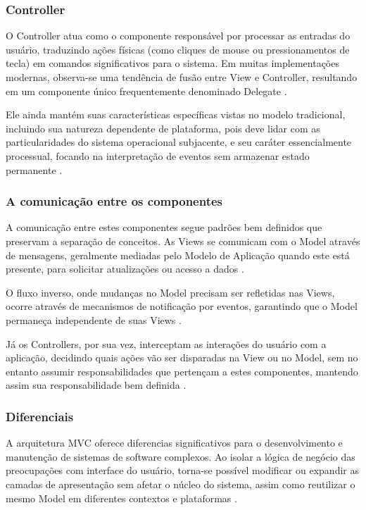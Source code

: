         \subsubsection{Controller}
            \par O Controller atua como o componente responsável por processar as entradas do usuário, traduzindo ações físicas (como cliques de mouse ou pressionamentos de tecla) em comandos significativos para o sistema. Em muitas implementações modernas, observa-se uma tendência de fusão entre View e Controller, resultando em um componente único frequentemente denominado Delegate \cite{artigo:deacon:2009}.
            
            \par Ele ainda mantém suas características específicas vistas no modelo tradicional, incluindo sua natureza dependente de plataforma, pois deve lidar com as particularidades do sistema operacional subjacente, e seu caráter essencialmente processual, focando na interpretação de eventos sem armazenar estado permanente \cite{artigo:deacon:2009}.
            
        \subsubsection{A comunicação entre os componentes}
        
            \par A comunicação entre estes componentes segue padrões bem definidos que preservam a separação de conceitos. As Views se comunicam com o Model através de mensagens, geralmente mediadas pelo Modelo de Aplicação quando este está presente, para solicitar atualizações ou acesso a dados \cite{artigo:deacon:2009}.
            
            \par O fluxo inverso, onde mudanças no Model precisam ser refletidas nas Views, ocorre através de mecanismos de notificação por eventos, garantindo que o Model permaneça independente de suas Views \cite{artigo:deacon:2009}.
            
            \par Já os Controllers, por sua vez, interceptam as interações do usuário com a aplicação, decidindo quais ações vão ser disparadas na View ou no Model, sem no entanto assumir responsabilidades que pertençam a estes componentes, mantendo assim sua responsabilidade bem definida \cite{artigo:deacon:2009}.
            
        \subsubsection{Diferenciais}
            \par A arquitetura MVC oferece diferencias significativos para o desenvolvimento e manutenção de sistemas de software complexos. Ao isolar a lógica de negócio das preocupações com interface do usuário, torna-se possível modificar ou expandir as camadas de apresentação sem afetar o núcleo do sistema, assim como reutilizar o mesmo Model em diferentes contextos e plataformas \cite{artigo:deacon:2009}.
            

